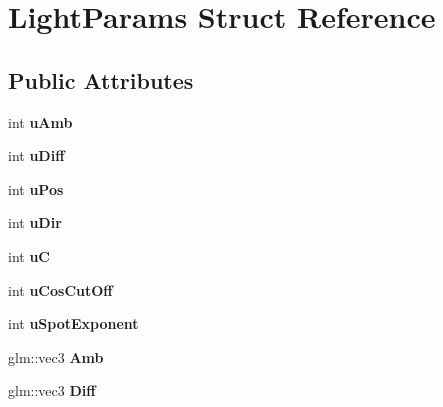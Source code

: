 \hypertarget{struct_light_params}{}\section{Light\+Params Struct Reference}
\label{struct_light_params}
\subsection*{Public Attributes}
\begin{DoxyCompactItemize}
\item 
\hypertarget{struct_light_params_ad7ba6aa7e333ba4552cddce6e58ee11b}{}int {\bfseries u\+Amb}\label{struct_light_params_ad7ba6aa7e333ba4552cddce6e58ee11b}

\item 
\hypertarget{struct_light_params_a4b08902022f1049975054635ab02a373}{}int {\bfseries u\+Diff}\label{struct_light_params_a4b08902022f1049975054635ab02a373}

\item 
\hypertarget{struct_light_params_af93dcacd5dc9afa86f47c1fc6dafd1de}{}int {\bfseries u\+Pos}\label{struct_light_params_af93dcacd5dc9afa86f47c1fc6dafd1de}

\item 
\hypertarget{struct_light_params_a2c5ef6397619c3d9f9ebc3f85a60e271}{}int {\bfseries u\+Dir}\label{struct_light_params_a2c5ef6397619c3d9f9ebc3f85a60e271}

\item 
\hypertarget{struct_light_params_a19c2f90d8bd6212458a36faba22a25d3}{}int {\bfseries u\+C}\label{struct_light_params_a19c2f90d8bd6212458a36faba22a25d3}

\item 
\hypertarget{struct_light_params_aede0ecb733b98b5d9fa9aea079a19e32}{}int {\bfseries u\+Cos\+Cut\+Off}\label{struct_light_params_aede0ecb733b98b5d9fa9aea079a19e32}

\item 
\hypertarget{struct_light_params_af5f5bd61015288e5fe8c4fe99ae22948}{}int {\bfseries u\+Spot\+Exponent}\label{struct_light_params_af5f5bd61015288e5fe8c4fe99ae22948}

\item 
\hypertarget{struct_light_params_a27052b5211820c45d996f5106880514d}{}glm\+::vec3 {\bfseries Amb}\label{struct_light_params_a27052b5211820c45d996f5106880514d}

\item 
\hypertarget{struct_light_params_a68f0078bf3744578ae5a655365c913b1}{}glm\+::vec3 {\bfseries Diff}\label{struct_light_params_a68f0078bf3744578ae5a655365c913b1}


\end{DoxyCompactItemize}
